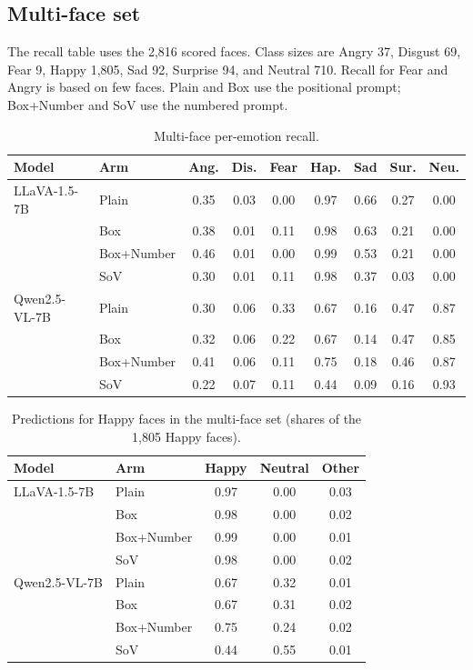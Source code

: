 \documentclass[lettersize,journal]{IEEEtran}
\begin{document}
\subsection{Multi-face set}
The recall table uses the 2,816 scored faces. Class sizes are Angry 37, Disgust 69, Fear 9, Happy 1,805, Sad 92, Surprise 94, and Neutral 710. Recall for Fear and Angry is based on few faces. Plain and Box use the positional prompt; Box+Number and SoV use the numbered prompt.
\begin{table}[!t]
\caption{Multi-face per-emotion recall.}
\label{tab:app_recall_multi}
\centering
\scriptsize
\setlength{\tabcolsep}{3pt}
\begin{tabular}{llccccccc}
\toprule
Model & Arm & Ang. & Dis. & Fear & Hap. & Sad & Sur. & Neu. \\
\midrule
LLaVA-1.5-7B & Plain & 0.35 & 0.03 & 0.00 & 0.97 & 0.66 & 0.27 & 0.00 \\
& Box & 0.38 & 0.01 & 0.11 & 0.98 & 0.63 & 0.21 & 0.00 \\
& Box+Number & 0.46 & 0.01 & 0.00 & 0.99 & 0.53 & 0.21 & 0.00 \\
& SoV & 0.30 & 0.01 & 0.11 & 0.98 & 0.37 & 0.03 & 0.00 \\
\midrule
Qwen2.5-VL-7B & Plain & 0.30 & 0.06 & 0.33 & 0.67 & 0.16 & 0.47 & 0.87 \\
& Box & 0.32 & 0.06 & 0.22 & 0.67 & 0.14 & 0.47 & 0.85 \\
& Box+Number & 0.41 & 0.06 & 0.11 & 0.75 & 0.18 & 0.46 & 0.87 \\
& SoV & 0.22 & 0.07 & 0.11 & 0.44 & 0.09 & 0.16 & 0.93 \\
\bottomrule
\end{tabular}
\end{table}

\begin{table}[!t]
\caption{Predictions for Happy faces in the multi-face set (shares of the 1,805 Happy faces).}
\label{tab:app_happy}
\centering
\scriptsize
\setlength{\tabcolsep}{3pt}
\begin{tabular}{llccc}
\toprule
Model & Arm & Happy & Neutral & Other \\
\midrule
LLaVA-1.5-7B & Plain & 0.97 & 0.00 & 0.03 \\
& Box & 0.98 & 0.00 & 0.02 \\
& Box+Number & 0.99 & 0.00 & 0.01 \\
& SoV & 0.98 & 0.00 & 0.02 \\
\midrule
Qwen2.5-VL-7B & Plain & 0.67 & 0.32 & 0.01 \\
& Box & 0.67 & 0.31 & 0.02 \\
& Box+Number & 0.75 & 0.24 & 0.02 \\
& SoV & 0.44 & 0.55 & 0.01 \\
\bottomrule
\end{tabular}
\end{table}
\end{document}
